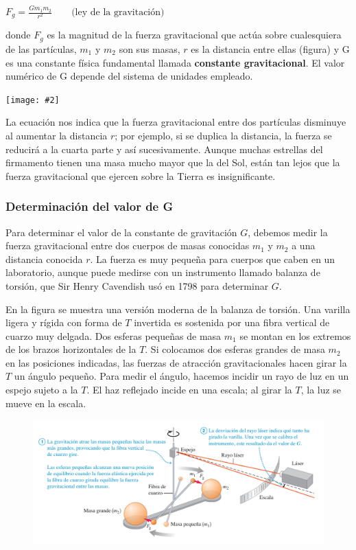 \documentclass{article}
\newcommand{\newtitle}[1]{
    \color{titleColor}
    \subsubsection{#1}
    \color{black}
}
\newcommand{\bl}[1]{\textbf{#1}}
\newcommand{\definicion}[1]{%
    \vspace{0.5cm}
    \begin{definicionbox}
        #1
    \end{definicionbox}
    \vspace{0.5cm}
}
\newcommand{\ladoALado}[4]{
    \begin{minipage}[t]{#3\textwidth}
        \vspace{0pt}
        #1
    \end{minipage}
    \hfill
    \begin{minipage}[t]{#4\textwidth}
        \vspace{0pt}
        \centering
        \texttt{[image: \#2]}
    \end{minipage}
}
\begin{document}
    \definicion{
        \centering
        \( F_g = \frac{G m_1 m_2}{r^2} \quad \quad \text{(ley de la gravitación)} \)
    }

    \ladoALado{
        \noindent donde $F_g$ es la magnitud de la fuerza gravitacional que actúa sobre cualesquiera de las partículas, $m_1$ y $m_2$ son sus masas, $r$ es la distancia entre ellas (ﬁgura) y G es una constante física fundamental llamada \bl{constante gravitacional}. El valor numérico de G depende del sistema de unidades empleado.
    }{img/11.1-1.png}{0.5}{0.5}

    \par La ecuación nos indica que la fuerza gravitacional entre dos partículas disminuye al aumentar la distancia $r$; por ejemplo, si se duplica la distancia, la fuerza se reducirá a la cuarta parte y así sucesivamente. Aunque muchas estrellas del ﬁrmamento tienen una masa mucho mayor que la del Sol, están tan lejos que la fuerza gravitacional que ejercen sobre la Tierra es insigniﬁcante.

    \newtitle{Determinación del valor de G}

    \par Para determinar el valor de la constante de gravitación $G$, debemos medir la fuerza gravitacional entre dos cuerpos de masas conocidas $m_1$ y $m_2$ a una distancia conocida $r$. La fuerza es muy pequeña para cuerpos que caben en un laboratorio, aunque puede medirse con un instrumento llamado balanza de torsión, que Sir Henry Cavendish usó en 1798 para determinar $G$.
    
    \par En la ﬁgura se muestra una versión moderna de la balanza de torsión. Una varilla ligera y rígida con forma de $T$ invertida es sostenida por una ﬁbra vertical de cuarzo muy delgada. Dos esferas pequeñas de masa $m_1$ se montan en los extremos de los brazos horizontales de la $T$. Si colocamos dos esferas grandes de masa $m_2$ en las posiciones indicadas, las fuerzas de atracción gravitacionales hacen girar la $T$ un ángulo pequeño. Para medir el ángulo, hacemos incidir un rayo de luz en un espejo sujeto a la $T$. El haz reﬂejado incide en una escala; al girar la $T$, la luz se mueve en la escala.

    \begin{figure}[H]
        \centering
        \includegraphics[width=\textwidth]{img/11.1-2.png}
    \end{figure}
\end{document}
